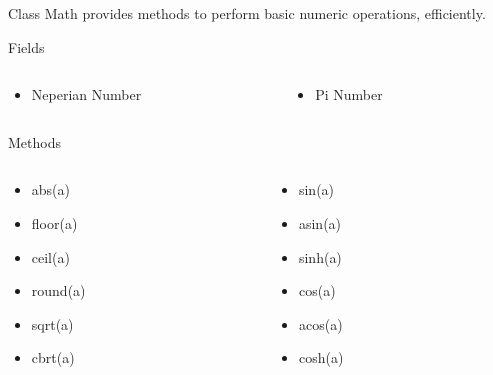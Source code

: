 \documentclass[10pt, compress]{beamer}
\begin{document}
\begin{slide}
	Class Math provides methods to perform basic numeric operations, efficiently.
	\begin{block}{Fields}
		\begin{columns}
			\begin{column}{0.5\textwidth}
				\begin{itemize}
					\item[] Neperian Number
				\end{itemize}
			\end{column}
			\begin{column}{0.5\textwidth}
				\begin{itemize}
					\item[] Pi Number
				\end{itemize}
			\end{column}
		\end{columns}
	\end{block}
	\begin{block}{Methods}
		\begin{columns}
			\begin{column}{0.5\textwidth}
				\begin{itemize}
					\item[] abs(a)
					\item[] floor(a)
					\item[] ceil(a)
					\item[] round(a)
					\item[] sqrt(a)
					\item[] cbrt(a)
				\end{itemize}
			\end{column}
			\begin{column}{0.5\textwidth}
				\begin{itemize}
					\item[] sin(a)
					\item[] asin(a)
					\item[] sinh(a)
					\item[] cos(a)
					\item[] acos(a)
					\item[] cosh(a)
				\end{itemize}
			\end{column}
		\end{columns}
	\end{block}
\end{slide}
\end{document}
